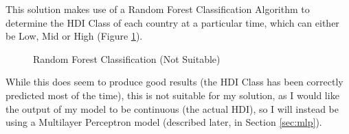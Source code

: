 \documentclass[12pt]{report}
\begin{document}
This solution makes use of a Random Forest Classification Algorithm to determine the HDI Class of each country at a particular time, which can either be Low, Mid or High (Figure \ref{fig:es2c}).
\begin{figure}[H]
\centering
{}
\caption{Random Forest Classification (Not Suitable)}\label{fig:es2c}
\end{figure}
While this does seem to produce good results (the HDI Class has been correctly predicted most of the time), this is not suitable for my solution, as I would like the output of my model to be continuous (the actual HDI), so I will instead be using a Multilayer Perceptron model (described later, in Section \ref{sec:mlp}).
\end{document}
